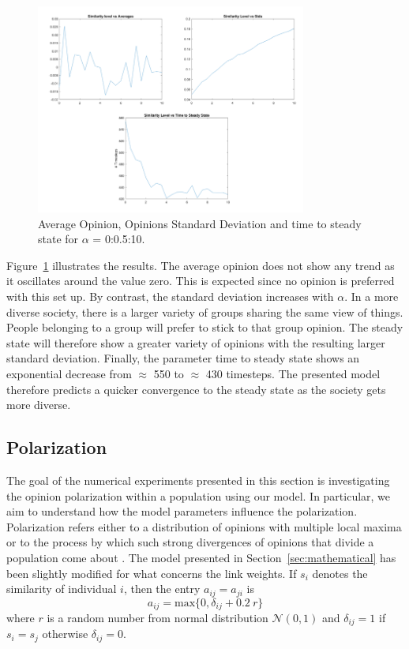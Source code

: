 \begin{figure}[!t]
	\centering
	\includegraphics[width=3.5in]{Figures/diversity_results.png}
	\caption{Average Opinion, Opinions Standard Deviation and time to steady state for $\alpha$ = 0:0.5:10.}
	\label{pics:diversityresults}
\end{figure}
Figure~\ref{pics:diversityresults} illustrates the results. The average opinion does not show any trend as it oscillates around the value zero. This is expected since no opinion is preferred with this set up. By contrast, the standard deviation increases with $\alpha$. In a more diverse society, there is a larger variety of groups sharing the same view of things. People belonging to a group will prefer to stick to that group opinion. The steady state will therefore show a greater variety of opinions with the resulting larger standard deviation. Finally, the parameter time to steady state shows an exponential decrease from $\approx$ 550 to $\approx$ 430 timesteps. The presented model therefore predicts a quicker convergence to the steady state as the society gets more diverse.
\subsection{Polarization}

The goal of the numerical experiments presented in this section is investigating the opinion polarization within a population using our model. In particular, we aim to understand how the model parameters influence the polarization. 
Polarization refers either to a distribution of opinions with multiple local maxima or to the process by which such strong divergences of opinions that divide a population come about \cite{Banisch2019}\cite{Bramsona2016}. The model presented in Section~\ref{sec:mathematical} has been slightly modified for what concerns the link weights. If $s_i$ denotes the similarity of individual $i$, then the entry $a_{ij} = a_{ji}$ is 
\begin{equation}
a_{ij} = \text{max}\{0, \delta_{ij} + 0.2\ r\}
\end{equation}
where $r$ is a random number from normal distribution $\mathcal{N}(0,1)$ and $\delta_{ij} = 1$ if $s_i = s_j$ otherwise $\delta_{ij} = 0$. 

